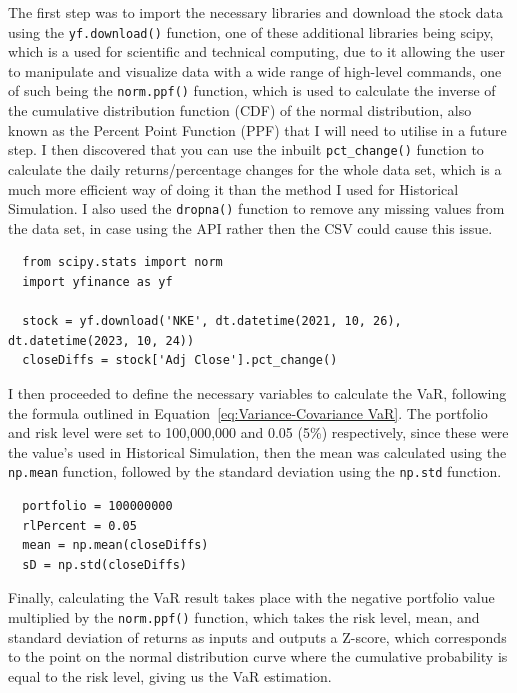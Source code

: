 \documentclass{article}
\begin{document}
The first step was to import the necessary libraries and download the stock data using the \texttt{yf.download()} function, one of these additional libraries being scipy, which is a used for scientific and technical computing, due to it allowing the user to manipulate and visualize data with a wide range of high-level commands, one of such being the \texttt{norm.ppf()} function, which is used to calculate the inverse of the cumulative distribution function (CDF) of the normal distribution, also known as the Percent Point Function (PPF) that I will need to utilise in a future step. I then discovered that you can use the inbuilt \texttt{pct\_change()} function to calculate the daily returns/percentage changes for the whole data set, which is a much more efficient way of doing it than the method I used for Historical Simulation. I also used the \texttt{dropna()} function to remove any missing values from the data set, in case using the API rather then the CSV could cause this issue.\\\vspace{0.3cm}

\begin{verbatim}
  from scipy.stats import norm
  import yfinance as yf
  
  stock = yf.download('NKE', dt.datetime(2021, 10, 26), dt.datetime(2023, 10, 24))
  closeDiffs = stock['Adj Close'].pct_change()
\end{verbatim}

I then proceeded to define the necessary variables to calculate the VaR, following the formula outlined in Equation~\ref{eq:Variance-Covariance VaR}. The portfolio and risk level were set to 100,000,000 and 0.05 (5\%) respectively, since these were the value's used in Historical Simulation, then the mean was calculated using the \texttt{np.mean} function, followed by the standard deviation using the \texttt{np.std} function.\\\vspace{0.3cm}

\begin{verbatim}
  portfolio = 100000000
  rlPercent = 0.05
  mean = np.mean(closeDiffs)
  sD = np.std(closeDiffs)
\end{verbatim}

Finally, calculating the VaR result takes place with the negative portfolio value multiplied by the \texttt{norm.ppf()} function, which takes the risk level, mean, and standard deviation of returns as inputs and outputs a Z-score, which corresponds to the point on the normal distribution curve where the cumulative probability is equal to the risk level, giving us the VaR estimation.\\\vspace{0.3cm}
\end{document}
